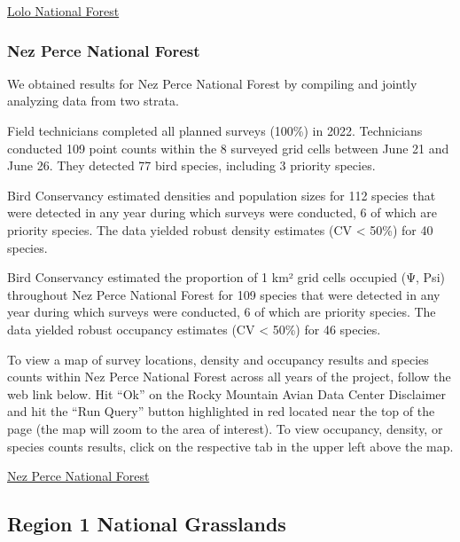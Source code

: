 \documentclass[
  letterpaper,
  DIV=11,
  numbers=noendperiod,
  oneside]{scrreprt}
\begin{document}
\href{http://www.rmbo.org/new_site/adc/QueryWindow.aspx\#N4IgzgrgDgpgTmALnAhoiBbEAuABCAGQHsAbI3AOTQEsiA7FE3AMSLhiRAF8g===}{Lolo
National Forest}

\hypertarget{nez-perce-national-forest}{%
\subsubsection{Nez Perce National
Forest}\label{nez-perce-national-forest}}

We obtained results for Nez Perce National Forest by compiling and
jointly analyzing data from two strata.

Field technicians completed all planned surveys (100\%) in 2022.
Technicians conducted 109 point counts within the 8 surveyed grid cells
between June 21 and June 26. They detected 77 bird species, including 3
priority species.

Bird Conservancy estimated densities and population sizes for 112
species that were detected in any year during which surveys were
conducted, 6 of which are priority species. The data yielded robust
density estimates (CV \textless{} 50\%) for 40 species.

Bird Conservancy estimated the proportion of 1 km² grid cells occupied
(Ψ, Psi) throughout Nez Perce National Forest for 109 species that were
detected in any year during which surveys were conducted, 6 of which are
priority species. The data yielded robust occupancy estimates (CV
\textless{} 50\%) for 46 species.

To view a map of survey locations, density and occupancy results and
species counts within Nez Perce National Forest across all years of the
project, follow the web link below. Hit ``Ok'' on the Rocky Mountain
Avian Data Center Disclaimer and hit the ``Run Query'' button
highlighted in red located near the top of the page (the map will zoom
to the area of interest). To view occupancy, density, or species counts
results, click on the respective tab in the upper left above the map.

\href{http://www.rmbo.org/new_site/adc/QueryWindow.aspx\#N4IgzgrgDgpgTmALnAhoiBbEAuABCAORgC9cAFeAYxlwLQEsB7AOxQBtcAxRuGJEAL5A}{Nez
Perce National Forest}

\hypertarget{region-1-national-grasslands}{%
\subsection{Region 1 National
Grasslands}\label{region-1-national-grasslands}}
\end{document}
